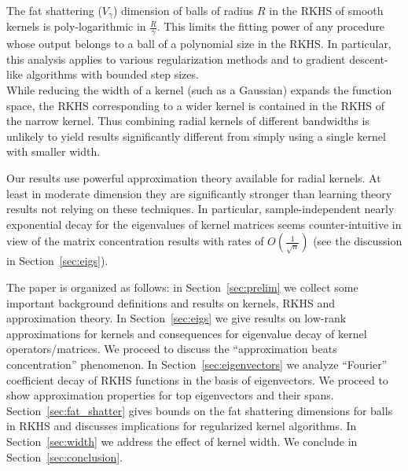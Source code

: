 \documentclass[final,12pt]{colt2018}
\begin{document}
 The fat shattering ($V_\gamma$) dimension of balls of radius $R$ in the RKHS  of smooth kernels is poly-logarithmic in $\frac{R}{\gamma}$. 
This limits the fitting power of any procedure whose output belongs to a ball of a polynomial size in the RKHS. In particular, this analysis applies to various regularization methods and to gradient descent-like algorithms with  bounded step sizes.\\ 
 While reducing the width of a kernel (such as a Gaussian) expands the function space, the RKHS corresponding to a wider kernel is contained in the RKHS  of the narrow kernel. 
Thus  combining radial kernels of different bandwidths is unlikely to yield results significantly different from simply using a single kernel with smaller width. 
 
Our results use powerful approximation theory available for radial kernels. At least in moderate dimension they are significantly stronger than   learning theory results not relying on these techniques. In particular,  sample-independent nearly exponential decay for the eigenvalues of kernel matrices seems counter-intuitive in view of the matrix concentration results with rates of $O(\frac{1}{\sqrt{n}})$ (see the discussion in Section~\ref{sec:eigs}).
 
 The paper is organized as follows: in Section~\ref{sec:prelim} we collect  some important background definitions and results on kernels, RKHS and approximation theory. 
In Section~\ref{sec:eigs} we give results on low-rank approximations for kernels and  consequences for  eigenvalue decay of kernel operators/matrices. We proceed to discuss the ``approximation beats concentration'' phenomenon. In Section~\ref{sec:eigenvectors}
we analyze 
 ``Fourier'' coefficient decay of RKHS functions in the basis of eigenvectors. We proceed to show  approximation properties for top eigenvectors and their spans.
 Section~\ref{sec:fat_shatter} gives bounds on the fat shattering dimensions for balls in RKHS and discusses implications for regularized kernel algorithms.
In Section~\ref{sec:width} we address the effect of kernel width. We conclude in Section~\ref{sec:conclusion}.
 

\end{document}
